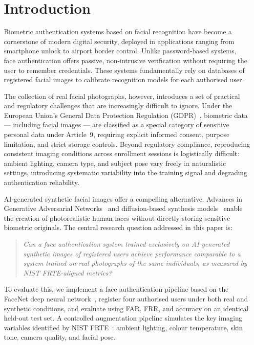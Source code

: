 \documentclass[conference]{IEEEtran}
\begin{document}
\section{Introduction}

Biometric authentication systems based on facial recognition have become a cornerstone of modern digital security, deployed in applications ranging from smartphone unlock to airport border control. Unlike password-based systems, face authentication offers passive, non-intrusive verification without requiring the user to remember credentials. These systems fundamentally rely on databases of registered facial images to calibrate recognition models for each authorised user.

The collection of real facial photographs, however, introduces a set of practical and regulatory challenges that are increasingly difficult to ignore. Under the European Union's General Data Protection Regulation (GDPR)~\cite{gdpr2016}, biometric data — including facial images — are classified as a special category of sensitive personal data under Article~9, requiring explicit informed consent, purpose limitation, and strict storage controls. Beyond regulatory compliance, reproducing consistent imaging conditions across enrollment sessions is logistically difficult: ambient lighting, camera type, and subject pose vary freely in naturalistic settings, introducing systematic variability into the training signal and degrading authentication reliability.

AI-generated synthetic facial images offer a compelling alternative. Advances in Generative Adversarial Networks~\cite{goodfellow2014gan} and diffusion-based synthesis models~\cite{rombach2022diffusion} enable the creation of photorealistic human faces without directly storing sensitive biometric originals. The central research question addressed in this paper is:

\begin{quote}
\textit{Can a face authentication system trained exclusively on AI-generated synthetic images of registered users achieve performance comparable to a system trained on real photographs of the same individuals, as measured by NIST FRTE-aligned metrics?}
\end{quote}

To evaluate this, we implement a face authentication pipeline based on the FaceNet deep neural network~\cite{schroff2015facenet}, register four authorised users under both real and synthetic conditions, and evaluate using FAR, FRR, and accuracy on an identical held-out test set. A controlled augmentation pipeline simulates the key imaging variables identified by NIST FRTE~\cite{nist_frte}: ambient lighting, colour temperature, skin tone, camera quality, and facial pose.
\end{document}
